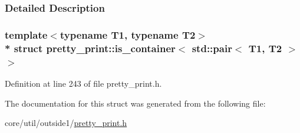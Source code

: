 \subsubsection{Detailed Description}
\subsubsection*{template$<$typename T1, typename T2$>$\\*
struct pretty\+\_\+print\+::is\+\_\+container$<$ std\+::pair$<$ T1, T2 $>$ $>$}



Definition at line 243 of file pretty\+\_\+print.\+h.



The documentation for this struct was generated from the following file\+:\begin{DoxyCompactItemize}
\item 
core/util/outside1/\hyperlink{pretty__print_8h}{pretty\+\_\+print.\+h}\end{DoxyCompactItemize}
